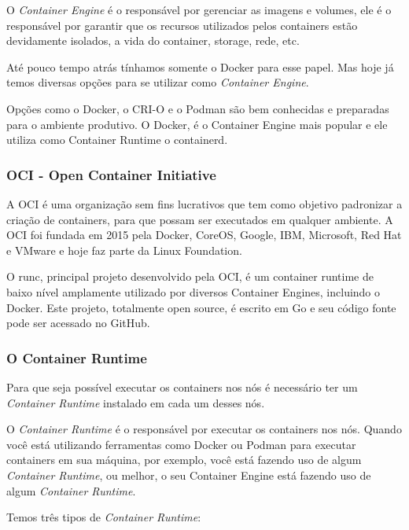 \documentclass[12pt,a4paper]{article}
\begin{document}
O \textit{Container Engine} é o responsável por gerenciar as imagens e volumes, ele é o responsável por garantir que os recursos utilizados pelos containers estão devidamente isolados, a vida do container, storage, rede, etc.

Até pouco tempo atrás tínhamos somente o Docker para esse papel. Mas hoje já temos diversas opções para se utilizar como \textit{Container Engine}.

Opções como o Docker, o CRI-O e o Podman são bem conhecidas e preparadas para o ambiente produtivo. O Docker, é o Container Engine mais popular e ele utiliza como Container Runtime o containerd.

\subsubsection{OCI - Open Container Initiative}
\label{sec:oci}

A OCI é uma organização sem fins lucrativos que tem como objetivo padronizar a criação de containers, para que possam ser executados em qualquer ambiente. A OCI foi fundada em 2015 pela Docker, CoreOS, Google, IBM, Microsoft, Red Hat e VMware e hoje faz parte da Linux Foundation.

O runc, principal projeto desenvolvido pela OCI, é um container runtime de baixo nível amplamente utilizado por diversos Container Engines, incluindo o Docker. Este projeto, totalmente open source, é escrito em Go e seu código fonte pode ser acessado no GitHub.

\subsubsection{O Container Runtime}
\label{sec:runtime}

Para que seja possível executar os containers nos nós é necessário ter um \textit{Container Runtime} instalado em cada um desses nós.

O \textit{Container Runtime} é o responsável por executar os containers nos nós. Quando você está utilizando ferramentas como Docker ou Podman para executar containers em sua máquina, por exemplo, você está fazendo uso de algum \textit{Container Runtime}, ou melhor, o seu Container Engine está fazendo uso de algum \textit{Container Runtime}.

Temos três tipos de \textit{Container Runtime}:
\end{document}
